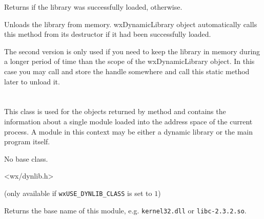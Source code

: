 Returns \true if the library was successfully loaded, \false otherwise.


\label{wxdynamiclibraryunload}



Unloads the library from memory. wxDynamicLibrary object automatically calls
this method from its destructor if it had been successfully loaded.

The second version is only used if you need to keep the library in memory
during a longer period of time than the scope of the wxDynamicLibrary object.
In this case you may call  and store
the handle somewhere and call this static method later to unload it.


\section{}\label{wxdynamiclibrarydetails}

This class is used for the objects returned by 
 method and
contains the information about a single module loaded into the address space of
the current process. A module in this context may be either a dynamic library
or the main program itself.


No base class.


<wx/dynlib.h>

(only available if \texttt{wxUSE\_DYNLIB\_CLASS} is set to $1$)


\label{wxdynamiclibrarygetname}


Returns the base name of this module, e.g. \texttt{kernel32.dll} or 
\texttt{libc-2.3.2.so}.


\label{wxdynamiclibrarygetpath}


